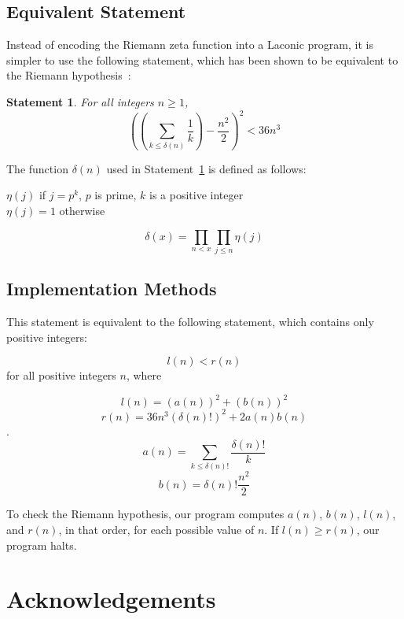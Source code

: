 \documentclass[11pt]{article}
\newtheorem{statement}{Statement}
\newenvironment{nscenter}
 {\parskip=0pt\par\nopagebreak\centering}
 {\par\noindent\ignorespacesafterend}
\begin{document}
\subsection{Equivalent Statement}

Instead of encoding the Riemann zeta function into a Laconic program, it is simpler to use the following statement, which has been shown to be equivalent to the Riemann hypothesis~\cite{riemann}:\\

\begin{statement} \label{eq:riemann}
For all integers $n \ge 1$, 
$$\left(\left(\sum_{k \le \delta(n)} \frac{1}{k}\right) - \frac{n^2}{2}\right)^2 < 36n^3$$
\end{statement}

The function $\delta(n)$ used in Statement~\ref{eq:riemann} is defined as follows: \\

\begin{nscenter}
$\eta(j)$ if $j = p^k$, $p$ is prime, $k$ is a positive integer \\
$\eta(j) = 1$ otherwise
\end{nscenter}
$$\delta(x) = \prod_{n<x}\prod_{j \le n} \eta(j)$$

\subsection{Implementation Methods}

This statement is equivalent to the following statement, which contains only positive integers:

$$l(n) < r(n)$$ for all positive integers $n$, where

$$l(n) = (a(n))^2 + (b(n))^2$$
$$r(n) = 36n^3(\delta(n)!)^2 + 2a(n)b(n)$$.
$$a(n) = \sum_{k \le \delta(n)!} \frac{\delta(n)!}{k}$$
$$b(n) = \delta(n)!\frac{n^2}{2}$$

To check the Riemann hypothesis, our program computes $a(n)$, $b(n)$, $l(n)$, and $r(n)$, in that order, for each possible value of $n$. If $l(n) \ge r(n)$, our program halts.

\section{Acknowledgements}

\end{document}
